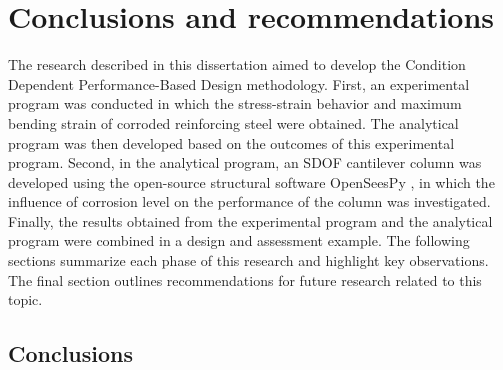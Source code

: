 \chapter{Conclusions and recommendations}

\label{chap-seven}

The research described in this dissertation aimed to develop the Condition Dependent Performance-Based Design methodology. First, an experimental program was conducted in which the stress-strain behavior and maximum bending strain of corroded reinforcing steel were obtained. The analytical program was then developed based on the outcomes of this experimental program. Second, in the analytical program, an SDOF cantilever column was developed using the open-source structural software OpenSeesPy \cite{Zhu2018}, in which the influence of corrosion level on the performance of the column was investigated. Finally, the results obtained from the experimental program and the analytical program were combined in a design and assessment example. The following sections summarize each phase of this research and highlight key observations. The final section outlines recommendations for future research related to this topic.

\section{Conclusions}
